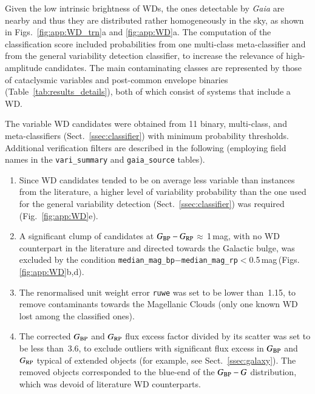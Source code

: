 \documentclass[longauth]{aa}
\def\gaia{\textit{Gaia}\xspace}
\def\bp{$G_{\rm BP}$\xspace}
\def\rp{$G_{\rm RP}$\xspace}
\def\bprp{\mbox{$G_{\rm BP}-G_{\rm RP}$}\xspace}
\def\bpg{\mbox{$G_{\rm BP}-G$}\xspace}
\begin{document}
Given the low intrinsic brightness of WDs, the ones detectable by \gaia are nearby \citep[for example, see fig.~2 of][]{2019A&A...623A.110G} and thus they are distributed rather homogeneously in the sky, as shown in Figs.~\ref{fig:app:WD_trn}a and \ref{fig:app:WD}a.
The computation of the classification score included probabilities from one multi-class meta-classifier and from the general variability detection classifier, to increase the relevance of high-amplitude candidates.
The main contaminating classes are represented by those of cataclysmic variables and post-common envelope binaries (Table~\ref{tab:results_details}), both of which consist of systems that include a WD.

The variable WD candidates were obtained from 11 binary, multi-class, and meta-classifiers (Sect.~\ref{ssec:classifier}) with minimum probability thresholds. Additional verification filters are described in the following (employing field names in the \texttt{vari\_summary} and \texttt{gaia\_source} tables).
\begin{enumerate}
    \item Since WD candidates tended to be on average less variable than instances from the literature, a higher level of variability probability than the one used for the general variability detection (Sect.~\ref{ssec:classifier}) was required (Fig.~\ref{fig:app:WD}e).
    \item A significant clump of candidates at \bprp$\approx$\,1\,mag, with no WD counterpart in the literature and directed towards the Galactic bulge, was excluded by the condition \texttt{median\_mag\_bp}$-$\texttt{median\_mag\_rp}$<$0.5\,mag\,(Figs.\,\ref{fig:app:WD}b,d). 
    \item The renormalised unit weight error \texttt{ruwe} was set to be lower than~1.15, to remove contaminants towards the Magellanic Clouds (only one known WD lost among the classified ones). 
    \item The corrected \bp and \rp flux excess factor \citep{2021A&A...649A...3R} divided by its scatter was set to be less than~3.6, to exclude outliers with significant flux excess in \bp and \rp typical of extended objects (for example, see Sect.~\ref{ssec:galaxy}). The removed objects corresponded to the blue-end of the \bpg distribution, which was devoid of literature WD counterparts.
\end{enumerate}
\end{document}
